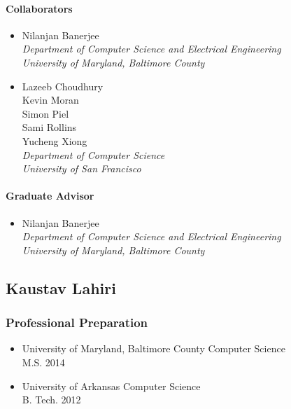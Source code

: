       \paragraph{Collaborators}
	\begin{itemize}
          \item Nilanjan Banerjee\\
            \textit{Department of Computer Science and Electrical Engineering
              \\University of Maryland, Baltimore County}
          \item Lazeeb Choudhury\\
            Kevin Moran\\
            Simon Piel\\
            Sami Rollins\\
            Yucheng Xiong\\
            \textit{Department of Computer Science\\University of San
	      Francisco}
        \end{itemize}
      \paragraph{Graduate Advisor}
	\begin{itemize}
          \item Nilanjan Banerjee\\
            \textit{Department of Computer Science and Electrical Engineering\\
              University of Maryland, Baltimore County}
        \end{itemize}
        
  \subsection{Kaustav Lahiri}
    \subsubsection{Professional Preparation}
      \begin{itemize}
        \item University of Maryland, Baltimore County \hfill Computer Science
	  \\ M.S. 2014
	\item University of Arkansas \hfill Computer Science
	  \\ B. Tech. 2012
      \end{itemize}
